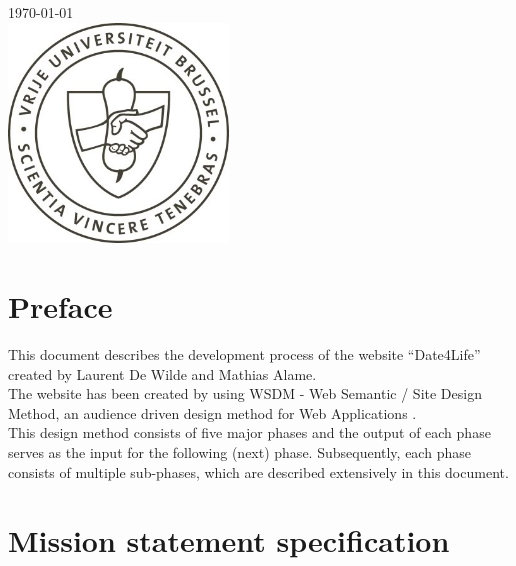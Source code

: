 \documentclass[11pt, a4paper,svglistings,oneside]{book}
\begin{document}
\begin{titlepage}
{\large \today}\\[3cm]


\includegraphics[width=2.3in]{vub_schild.jpg}\\[4cm] 
 




\end{titlepage}

 \frontmatter

\tableofcontents

\listoffigures

\chapter{Preface}

This document describes the development process of the website ``Date4Life'' created by Laurent De Wilde and Mathias Alame. \\
The website has been created by using WSDM - Web Semantic / Site Design Method, an audience driven design method for Web Applications \citep{WSDM2}. \\
This design method consists of five major phases and the output of each phase serves as the input for the following (next) phase. Subsequently, each phase consists of multiple sub-phases, which are described extensively in this document.

\mainmatter

\chapter{Mission statement specification}
\end{document}
